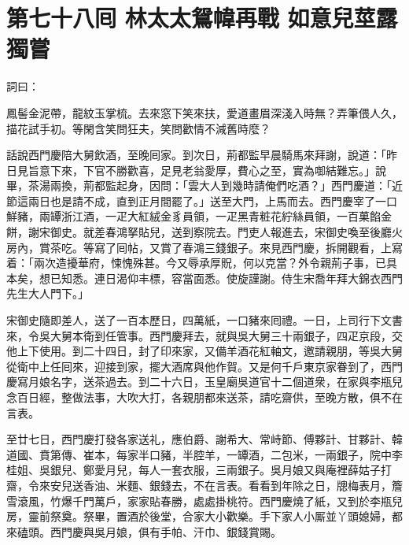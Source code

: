 
\chapter*{第七十八囘 林太太鴛幃再戰 如意兒莖露獨嘗}


詞曰：

鳳髻金泥帶，龍紋玉掌梳。去來窓下笑來扶，愛道畫眉深淺入時無？弄筆偎人久，描花試手初。等閑含笑問狂夫，笑問歡情不減舊時麼？

話說西門慶陪大舅飲酒，至晚囘家。到次日，荊都監早晨騎馬來拜謝，說道：「昨日見旨意下來，下官不勝歡喜，足見老翁愛厚，費心之至，實為啣結難忘。」說畢，茶湯兩換，荊都監起身，因問：「雲大人到幾時請俺們吃酒？」西門慶道：「近節這兩日也是請不成，直到正月間罷了。」送至大門，上馬而去。西門慶宰了一口鮮豬，兩罈浙江酒，一疋大紅絨金豸員領，一疋黑青粧花紵絲員領，一百菓餡金餅，謝宋御史。就差春鴻拏貼兒，送到察院去。門吏人報進去，宋御史喚至後廳火房內，賞茶吃。等寫了囘帖，又賞了春鴻三錢銀子。來見西門慶，拆開觀看，上寫着：「兩次造擾華府，悚愧殊甚。今又辱承厚貺，何以克當？外令親荊子事，已具本矣，想已知悉。連日渴仰丰標，容當面悉。使旋謹謝。侍生宋喬年拜大錦衣西門先生大人門下。」

宋御史隨即差人，送了一百本歷日，四萬紙，一口豬來囘禮。一日，上司行下文書來，令吳大舅本衛到任管事。西門慶拜去，就與吳大舅三十兩銀子，四疋京段，交他上下使用。到二十四日，封了印來家，又備羊酒花紅軸文，邀請親朋，等吳大舅從衛中上任囘來，迎接到家，擺大酒席與他作賀。又是何千戶東京家眷到了，西門慶寫月娘名字，送茶過去。到二十六日，玉皇廟吳道官十二個道衆，在家與李瓶兒念百日經，整做法事，大吹大打，各親朋都來送茶，請吃齋供，至晚方散，俱不在言表。

至廿七日，西門慶打發各家送礼，應伯爵、謝希大、常峙節、傅夥計、甘夥計、韓道國、賁第傳、崔本，每家半口豬，半腔羊，一罈酒，二包米，一兩銀子，院中李桂姐、吳銀兒、鄭愛月兒，每人一套衣服，三兩銀子。{}吳月娘又與庵裡薛姑子打齋，令來安兒送香油、米麵、銀錢去，不在言表。看看到年除之日，牕梅表月，簷雪滾風，{}竹爆千門萬戶，家家貼春勝，處處掛桃符。西門慶燒了紙，又到於李瓶兒房，靈前祭奠。祭畢，置酒於後堂，合家大小歡樂。手下家人小厮並丫頭媳婦，都來磕頭。西門慶與吳月娘，俱有手帕、汗巾、銀錢賞賜。

